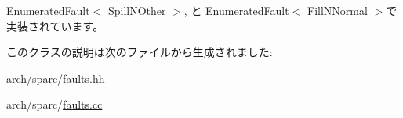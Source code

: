 \hyperlink{classSparcISA_1_1EnumeratedFault_aa059963bc65ed73d2d744374cd6da5b1}{EnumeratedFault$<$ SpillNOther $>$}, と \hyperlink{classSparcISA_1_1EnumeratedFault_aa059963bc65ed73d2d744374cd6da5b1}{EnumeratedFault$<$ FillNNormal $>$}で実装されています。

このクラスの説明は次のファイルから生成されました:\begin{DoxyCompactItemize}
\item 
arch/sparc/\hyperlink{arch_2sparc_2faults_8hh}{faults.hh}\item 
arch/sparc/\hyperlink{arch_2sparc_2faults_8cc}{faults.cc}\end{DoxyCompactItemize}
